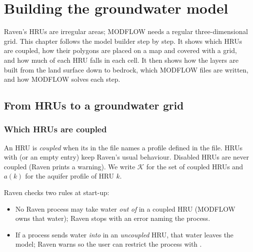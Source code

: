 \chapter{Building the groundwater model}\label{ch:c3}
Raven's HRUs are irregular areas; MODFLOW needs a regular three-dimensional grid. This chapter follows the model builder step by step. It shows which HRUs are coupled, how their polygons are placed on a map
and covered with a grid, and how much of each HRU falls in each cell. It then shows how the layers are built from the land
surface down to bedrock, which MODFLOW files are written, and how MODFLOW solves each step.

\section{From HRUs to a groundwater grid}\label{ch:grid}
\subsection{Which HRUs are coupled}
An HRU is \emph{coupled} when its  in the  file names a profile defined in the
 file. HRUs with \cmd{[NONE]} (or an empty entry) keep Raven's usual behaviour. Disabled HRUs are never
coupled (Raven prints a warning). We write $\mathcal{K}$ for the set of coupled HRUs and $a(k)$ for the aquifer profile of HRU $k$.

Raven checks two rules at start-up:
\begin{itemize}
\item No Raven process may take water \emph{out of}  in a coupled HRU (MODFLOW owns that water);
Raven stops with an error naming the process.
\item If a process sends water \emph{into}  in an \emph{uncoupled} HRU, that water leaves the model;
Raven warns so the user can restrict the process with .
\end{itemize}

